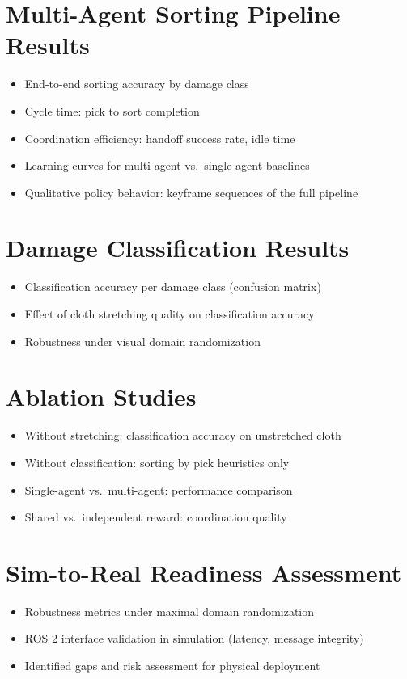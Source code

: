 \section{Multi-Agent Sorting Pipeline Results}
\begin{itemize}
    \item End-to-end sorting accuracy by damage class
    \item Cycle time: pick to sort completion
    \item Coordination efficiency: handoff success rate, idle time
    \item Learning curves for multi-agent vs.\ single-agent baselines
    \item Qualitative policy behavior: keyframe sequences of the full pipeline
\end{itemize}

\section{Damage Classification Results}
\begin{itemize}
    \item Classification accuracy per damage class (confusion matrix)
    \item Effect of cloth stretching quality on classification accuracy
    \item Robustness under visual domain randomization
\end{itemize}

\section{Ablation Studies}
\begin{itemize}
    \item Without stretching: classification accuracy on unstretched cloth
    \item Without classification: sorting by pick heuristics only
    \item Single-agent vs.\ multi-agent: performance comparison
    \item Shared vs.\ independent reward: coordination quality
\end{itemize}

\section{Sim-to-Real Readiness Assessment}
\begin{itemize}
    \item Robustness metrics under maximal domain randomization
    \item ROS 2 interface validation in simulation (latency, message integrity)
    \item Identified gaps and risk assessment for physical deployment
\end{itemize}

